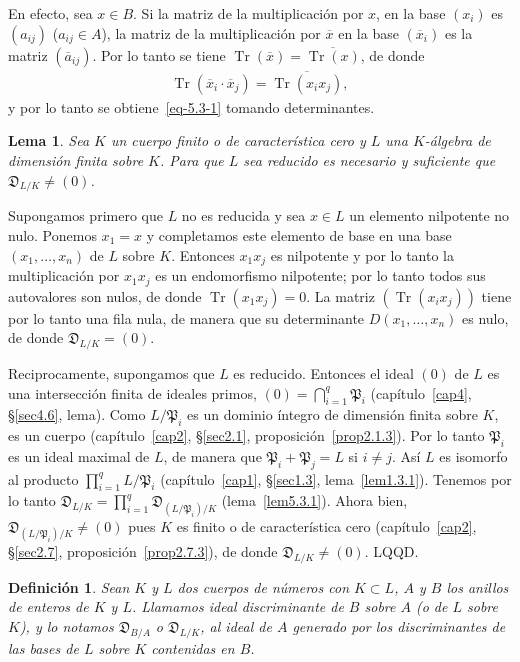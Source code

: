 \documentclass[bibtotoc,leqno,spanish]{amsbook}
\newcommand{\idl}[1]{\mathfrak{#1}}
\newcommand{\QED}{LQQD.}
\newcommand{\oline}[1]{\overline{#1}}
\newcommand{\disc}{\mathfrak{D}}
\DeclareMathOperator{\Tr}{Tr}
\numberwithin{equation}{section}
\theoremstyle{note}
\newtheorem{definition}{Definici\'on}
\theoremstyle{note}
\newtheorem{lemma}{Lema}
\theoremstyle{rem}
\numberwithin{theorem}{section}
\numberwithin{proposition}{section}
\numberwithin{definition}{section}
\numberwithin{lemma}{section}
\numberwithin{corollary}{section}
\numberwithin{example}{section}
\numberwithin{footnote}{section}%
\begin{document}
En efecto, sea $x\in B$. Si la matriz de la multiplicaci\'on por $x$, en la base $(x_{i})$ es $(a_{ij})$
($a_{ij}\in A$), la matriz de la multiplicaci\'on por $\oline x$ en la base $(\oline x_{i})$ es la matriz
$(\oline a_{ij})$. Por lo tanto se tiene $\Tr(\oline x) = \oline{\Tr(x)}$, de donde
\begin{gather*}
\Tr(\oline x_{i}\cdot\oline x_{j}) = \oline{\Tr(x_{i}x_{j})},
\end{gather*}
y por lo tanto se obtiene~\eqref{eq-5.3-1} tomando determinantes.

\begin{lemma}\label{lem5.3.3}
Sea $K$ un cuerpo finito o de caracter\'istica cero y $L$ una $K$-\'algebra de dimensi\'on finita sobre $K$.
Para que $L$ sea reducido es necesario y suficiente que $\disc_{L/K}\neq(0)$.
\end{lemma}

Supongamos primero que $L$ no es reducida y sea $x\in L$ un elemento nilpotente no nulo. Ponemos $x_{1}=x$ y
completamos este elemento de base en una base $(x_{1},\dots,x_{n})$ de $L$ sobre $K$. Entonces $x_{1}x_{j}$
es nilpotente y por lo tanto la multiplicaci\'on por $x_{1}x_{j}$ es un endomorfismo nilpotente; por lo tanto
todos sus autovalores son nulos, de donde $\Tr(x_{1}x_{j}) = 0$. La matriz $(\Tr(x_{i}x_{j}))$ tiene por lo tanto
una fila nula, de manera que su determinante $D(x_{1},\dots,x_{n})$ es nulo, de donde $\disc_{L/K}=(0)$.

Reciprocamente, supongamos que $L$ es reducido. Entonces el ideal $(0)$ de $L$ es una intersecci\'on finita
de ideales primos, $(0) = \bigcap_{i=1}^{q}\idl{P}_{i}$ (cap\'itulo~\ref{cap4}, \S\ref{sec4.6}, lema).
Como $L/\idl{P}_{i}$ es un dominio \'integro de dimensi\'on finita sobre $K$, es un cuerpo (cap\'itulo~\ref{cap2},
\S\ref{sec2.1}, proposici\'on~\ref{prop2.1.3}).
Por lo tanto $\idl{P}_{i}$ es un ideal maximal de $L$, de manera que $\idl{P}_{i}+\idl{P}_{j}=L$
si $i\neq j$. As\'i $L$ es isomorfo al producto $\prod_{i=1}^{q}L/\idl{P}_{i}$ (cap\'itulo~\ref{cap1}, \S\ref{sec1.3}, lema~\ref{lem1.3.1}).
Tenemos por lo tanto $\disc_{L/K}=\prod_{i=1}^{q}\disc_{(L/\idl{P}_{i})/K}$
(lema~\ref{lem5.3.1}). Ahora bien,
$\disc_{(L/\idl{P}_{i})/K}\neq(0)$ pues $K$ es finito o de caracter\'istica cero
(cap\'itulo~\ref{cap2}, \S\ref{sec2.7}, proposici\'on~\ref{prop2.7.3}), de donde $\disc_{L/K}\neq(0)$. \QED

\begin{definition}\label{defV.3.1}
Sean $K$ y $L$ dos cuerpos de n\'umeros con $K\subset L$, $A$ y $B$ los anillos de enteros de $K$ y $L$.
Llamamos ideal discriminante de $B$ sobre $A$ (o de $L$ sobre $K$), y lo notamos $\disc_{B/A}$ o $\disc_{L/K}$,
al ideal de $A$ generado por los discriminantes de las bases de $L$ sobre $K$ contenidas en $B$.
\end{definition}
\end{document}
